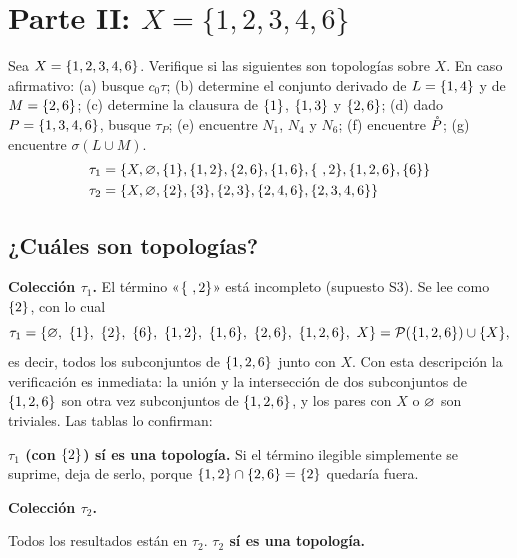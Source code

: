 \section{Parte II: \texorpdfstring{$X=\{1,2,3,4,6\}$}{X = \{1,2,3,4,6\}}}
\begin{enunciado}
Sea $X=\{1,2,3,4,6\}$. Verifique si las siguientes son topologías sobre $X$. En caso afirmativo:
(a) busque $c_0\tau$; (b) determine el conjunto derivado de $L=\{1,4\}$ y de $M=\{2,6\}$; (c) determine la clausura de
$\{1\}$, $\{1,3\}$ y $\{2,6\}$; (d) dado $P=\{1,3,4,6\}$, busque $\tau_P$; (e) encuentre $N_1$, $N_4$ y $N_6$;
(f) encuentre $\mathring{P}$; (g) encuentre $\sigma(L\cup M)$.
\begin{align*}
\tau_1&=\{X,\vac,\s{1},\s{1,2},\s{2,6},\s{1,6},\s{\ ,2},\s{1,2,6},\s{6}\}\\
\tau_2&=\{X,\vac,\s{2},\s{3},\s{2,3},\s{2,4,6},\s{2,3,4,6}\}
\end{align*}
\end{enunciado}

\subsection{¿Cuáles son topologías?}
\textbf{Colección $\tau_1$.} El término «$\{\ ,2\}$» está incompleto (supuesto S3). Se lee como $\{2\}$, con lo cual
\[
\tau_1=\{\vac,\ \s{1},\ \s{2},\ \s{6},\ \s{1,2},\ \s{1,6},\ \s{2,6},\ \s{1,2,6},\ X\}=\Pt(\s{1,2,6})\cup\{X\},
\]
es decir, todos los subconjuntos de $\{1,2,6\}$ junto con $X$. Con esta descripción la verificación es inmediata:
la unión y la intersección de dos subconjuntos de $\{1,2,6\}$ son otra vez subconjuntos de $\{1,2,6\}$, y los pares
con $X$ o $\varnothing$ son triviales. Las tablas lo confirman:
\begin{center}{\footnotesize\renewcommand{\arraystretch}{1.15}}\end{center}
\begin{center}{\footnotesize\renewcommand{\arraystretch}{1.15}}\end{center}
\textbf{$\tau_1$ (con $\{2\}$) sí es una topología.} Si el término ilegible simplemente se suprime, deja de serlo,
porque $\{1,2\}\cap\{2,6\}=\{2\}$ quedaría fuera.

\textbf{Colección $\tau_2$.}
\begin{center}{\footnotesize\renewcommand{\arraystretch}{1.15}}\end{center}
\begin{center}{\footnotesize\renewcommand{\arraystretch}{1.15}}\end{center}
Todos los resultados están en $\tau_2$. \textbf{$\tau_2$ sí es una topología.}

